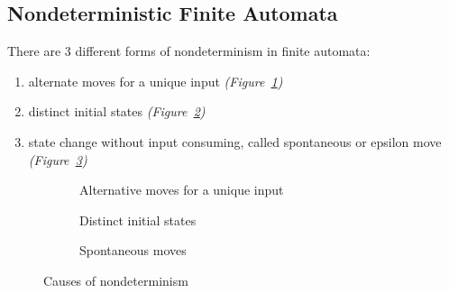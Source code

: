 \documentclass[english]{article}
\begin{document}
\subsection{Nondeterministic Finite Automata}

There are \(3\) different forms of nondeterminism in finite automata:

\begin{enumerate}
  \item alternate moves for a unique input \textit{(Figure~\ref{subfig:alternate-moves-unique-input})}
  \item distinct initial states \textit{(Figure~\ref{subfig:distinct-initial-states})}
  \item state change without input consuming, called spontaneous or epsilon move \textit{(Figure~\ref{subfig:spontaneous-moves})}
\end{enumerate}

\begin{figure}[htbp]
  \centering
  \bigskip
  \begin{subfigure}[t]{0.4\textwidth}
    \centering
    \caption{Alternative moves for a unique input}
    \label{subfig:alternate-moves-unique-input}
  \end{subfigure}
  \begin{subfigure}[t]{0.4\textwidth}
    \centering
    \caption{Distinct initial states}
    \label{subfig:distinct-initial-states}
  \end{subfigure}

  \bigskip

  \begin{subfigure}[b]{0.33\textwidth}
    \centering
    \caption{Spontaneous moves}
    \label{subfig:spontaneous-moves}
  \end{subfigure}
  \caption{Causes of nondeterminism}
  \label{fig:causes-of-nondeterminism}
  \bigskip
\end{figure}
\end{document}
